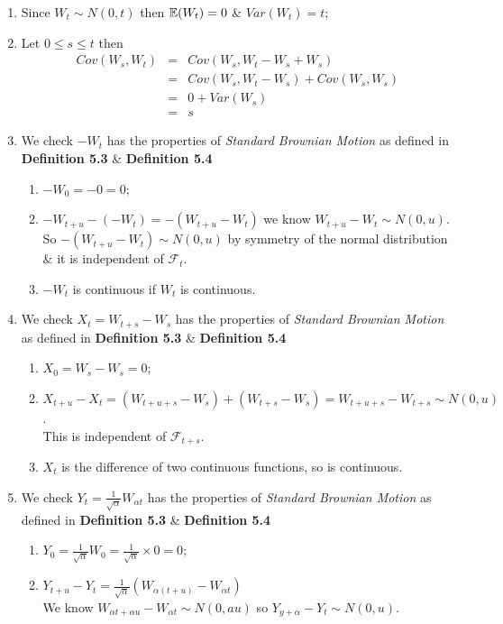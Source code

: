 \documentclass[11pt,a4paper]{article}
\begin{document}
\begin{enumerate}[label=\roman*)]
	\item Since $W_t\sim N(0,t)$ then $\mathbb{E}(W_t)=0$ \& $Var(W_t)=t$;
	\item Let $0\leq s\leq t$ then
	\[\begin{array}{rcl}
	Cov(W_s,W_t)&=&Cov(W_s,W_t-W_s+W_s)\\
	&=&Cov(W_s,W_t-W_s)+Cov(W_s,W_s)\\
	&=&0+Var(W_s)\\
	&=&s
	\end{array}\]
	\item We check $-W_t$ has the properties of \textit{Standard Brownian Motion} as defined in \textbf{Definition 5.3} \& \textbf{Definition 5.4}
	\begin{enumerate}
		\item $-W_0=-0=0$;
		\item $-W_{t+u}-(-W_t)=-(W_{t+u}-W_t)$ we know $W_{t+u}-W_t\sim N(0,u)$.\\
		So $-(W_{t+u}-W_t)\sim N(0,u)$ by symmetry of the normal distribution \& it is independent of $\mathcal{F}_t$.
		\item $-W_t$ is continuous if $W_t$ is continuous.
	\end{enumerate}
	\item We check $X_t=W_{t+s}-W_s$ has the properties of \textit{Standard Brownian Motion} as defined in \textbf{Definition 5.3} \& \textbf{Definition 5.4}
	\begin{enumerate}
		\item $X_0=W_s-W_s=0$;
		\item $X_{t+u}-X_t=(W_{t+u+s}-W_s)+(W_{t+s}-W_s)=W_{t+u+s}-W_{t+s}\sim N(0,u)$.\\
	This is independent of $\mathcal{F}_{t+s}$.
		\item $X_t$ is the difference of two continuous functions, so is continuous.
	\end{enumerate}
	\item We check $Y_t=\frac{1}{\sqrt{\alpha}}W_{\alpha t}$ has the properties of \textit{Standard Brownian Motion} as defined in \textbf{Definition 5.3} \& \textbf{Definition 5.4}
	\begin{enumerate}
		\item $Y_0=\frac{1}{\sqrt{\alpha}}W_0=\frac{1}{\sqrt{\alpha}}\times0=0$;
		\item $Y_{t+u}-Y_t=\frac{1}{\sqrt{\alpha}}(W_{\alpha(t+u)}-W_{\alpha t})$\\
		We know $W_{\alpha t+\alpha u}-W_{\alpha t}\sim N(0,au)$ so $Y_{y+\alpha}-Y_t\sim N(0,u)$.\\

\end{enumerate}
\end{enumerate}
\end{document}
